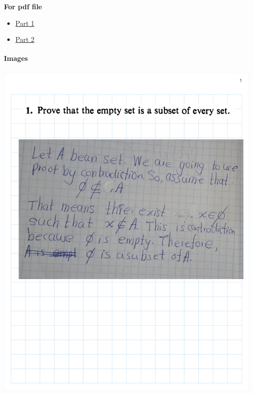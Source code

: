 \documentclass[
]{book}
\providecommand{\tightlist}{%
  \setlength{\itemsep}{0pt}\setlength{\parskip}{0pt}}
\theoremstyle{definition}
\theoremstyle{definition}
\theoremstyle{definition}
\theoremstyle{definition}
\theoremstyle{remark}
\begin{document}
\textbf{For pdf file}

\begin{itemize}
\tightlist
\item
  \href{pdf_docs/Rudin\%20Ch2.1.pdf}{Part 1}
\item
  \href{pdf_docs/Rudin\%20Ch2.2.pdf}{Part 2}
\end{itemize}

\paragraph{Images}\label{images}

\includegraphics{Figures/Ex-2/Rudin Ch2-1.png}
\end{document}
